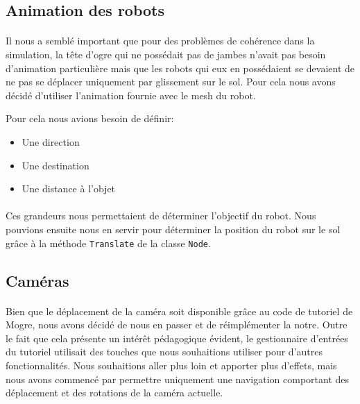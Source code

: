 \subsection{Animation des robots}

\paragraph{}
Il nous a semblé important que pour des problèmes de cohérence dans la
simulation, la tête d'ogre qui ne possédait pas de jambes n'avait pas besoin
d'animation particulière mais que les robots qui eux en possédaient se devaient de
ne pas se déplacer uniquement par glissement sur le sol. Pour cela nous avons
décidé d'utiliser l'animation fournie avec le mesh du robot. 

Pour cela nous avions besoin de définir:\\
\begin{itemize}
  \item Une direction
  \item Une destination
  \item Une distance à l'objet
\end{itemize}

\paragraph{}
Ces grandeurs nous permettaient de déterminer l'objectif du robot. Nous pouvions
ensuite nous en servir pour déterminer la position du robot sur le sol grâce à
la méthode \verb!Translate! de la classe \verb!Node!.

\subsection{Caméras}
\paragraph{}
Bien que le déplacement de la caméra soit disponible grâce au code de tutoriel
de Mogre, nous avons décidé de nous en passer et de réimplémenter la notre.
Outre le fait que cela présente un intérêt pédagogique évident, le gestionnaire
d'entrées du tutoriel utilisait des touches que nous souhaitions utiliser pour
d'autres fonctionnalités. Nous souhaitions aller plus loin et apporter plus
d'effets, mais nous avons commencé par permettre uniquement une navigation
comportant des déplacement et des rotations de la caméra actuelle.

